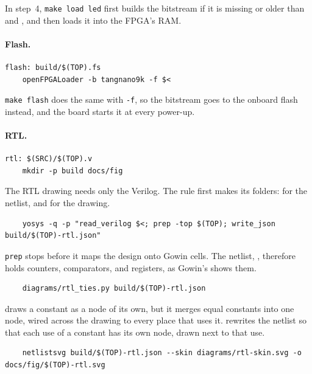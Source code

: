 \documentclass[11pt,a4paper]{article}
\begin{document}
In step~4, \texttt{make load led} first builds the bitstream if it is missing or older than  and , and then loads it into the FPGA’s RAM.

\paragraph{Flash.}

\begin{verbatim}
flash: build/$(TOP).fs
	openFPGALoader -b tangnano9k -f $<
\end{verbatim}

\texttt{make flash} does the same with \texttt{-f}, so the bitstream goes to the onboard flash instead, and the board starts it at every power-up.

\paragraph{RTL.}

\begin{verbatim}
rtl: $(SRC)/$(TOP).v
	mkdir -p build docs/fig
\end{verbatim}

The RTL drawing needs only the Verilog. The rule first makes its folders:  for the netlist, and  for the drawing.

\begin{verbatim}
	yosys -q -p "read_verilog $<; prep -top $(TOP); write_json build/$(TOP)-rtl.json"
\end{verbatim}

\texttt{prep} stops  before it maps the design onto Gowin cells. The netlist, , therefore holds counters, comparators, and registers, as Gowin’s  shows them.

\begin{verbatim}
	diagrams/rtl_ties.py build/$(TOP)-rtl.json
\end{verbatim}

 draws a constant as a node of its own, but it merges equal constants into one node, wired across the drawing to every place that uses it.  rewrites the netlist so that each use of a constant has its own node, drawn next to that use.

\begin{verbatim}
	netlistsvg build/$(TOP)-rtl.json --skin diagrams/rtl-skin.svg -o docs/fig/$(TOP)-rtl.svg
\end{verbatim}
\end{document}
